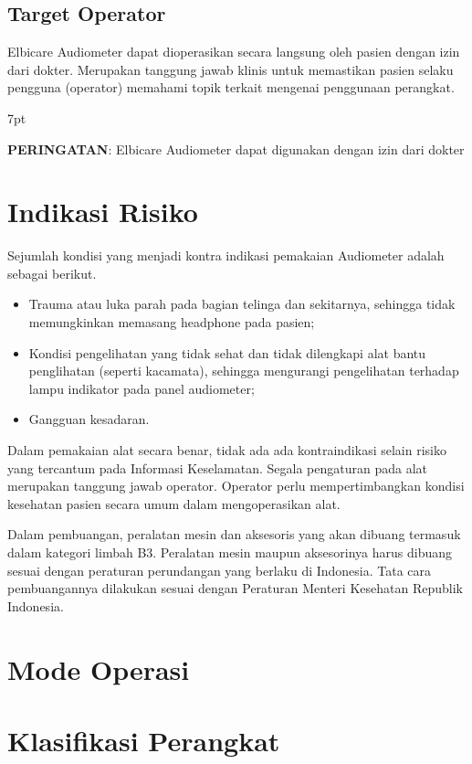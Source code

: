 \documentclass[11pt,a4paper,twoside,draft,onecolumn]{book}
\newenvironment{formalred}{%
	\def\FrameCommand{%
		\hspace{1pt}%
		{\color{red}\vrule width 2pt}%
		{\color{formalshade}\vrule width 4pt}%
		\colorbox{formalshade}%
	}%
	\MakeFramed{\advance\hsize-\width\FrameRestore}%
	\noindent\hspace{-4.55pt}%
	\begin{adjustwidth}{}{7pt}%
		\vspace{2pt}\vspace{2pt}%
	}
	{%
		\vspace{2pt}\end{adjustwidth}\endMakeFramed%
}
\begin{document}
			\subsection{Target Operator}
			Elbicare Audiometer dapat dioperasikan secara langsung oleh pasien dengan izin dari dokter. Merupakan tanggung jawab klinis untuk memastikan pasien selaku pengguna (operator) memahami topik terkait mengenai penggunaan perangkat.
			\begin{formalred}
				\raisebox{0.125ex}{\resizebox{!}{2ex}{\danger}} \textbf{PERINGATAN}: 
				Elbicare Audiometer dapat digunakan dengan izin dari dokter
			\end{formalred}	
		
		\section{Indikasi Risiko}
		Sejumlah kondisi yang menjadi kontra indikasi pemakaian Audiometer adalah sebagai berikut.
		\begin{itemize}
			\item Trauma atau luka parah pada bagian telinga dan sekitarnya, sehingga tidak memungkinkan memasang headphone pada pasien;
			\item Kondisi pengelihatan yang tidak sehat dan tidak dilengkapi alat bantu penglihatan (seperti kacamata), sehingga mengurangi pengelihatan terhadap lampu indikator pada panel audiometer;
			\item Gangguan kesadaran.
		\end{itemize}
	
		Dalam pemakaian alat secara benar, tidak ada ada kontraindikasi selain risiko yang tercantum pada Informasi Keselamatan. Segala pengaturan pada alat merupakan tanggung jawab operator. Operator perlu mempertimbangkan kondisi kesehatan pasien secara umum dalam mengoperasikan alat.
		
		Dalam pembuangan, peralatan mesin dan aksesoris yang akan dibuang termasuk dalam kategori limbah B3. Peralatan mesin maupun aksesorinya harus dibuang sesuai dengan peraturan perundangan yang berlaku di Indonesia. Tata cara pembuangannya dilakukan sesuai dengan Peraturan Menteri Kesehatan Republik Indonesia.
		
		\section{Mode Operasi}
		
		\section{Klasifikasi Perangkat}
		
\end{document}

